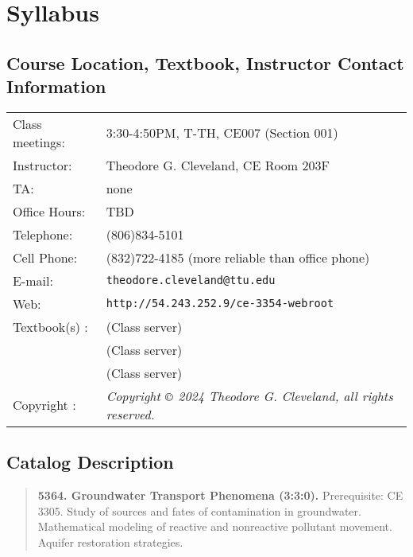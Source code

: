 \documentclass[12pt]{article}
\begin{document}
\section*{Syllabus}

\subsection*{{Course Location, Textbook, Instructor Contact Information}}
\begin{tabular}{p{1.5in}p{5.0in}}
Class meetings: &   3:30-4:50PM, T-TH, CE007 (Section 001) \\
Instructor: & Theodore G. Cleveland, CE Room 203F \\
TA: & none \\
Office Hours: & TBD \\%
Telephone: & (806)834-5101 \\
Cell Phone: & (832)722-4185 (more reliable than office phone) \\
E-mail: & \texttt{theodore.cleveland@ttu.edu}\\
Web: & \texttt{http://54.243.252.9/ce-3354-webroot}\\
Textbook(s) : & \cite{BRN1999} (Class server) \\
~ & \cite{Bear2010} (Class server) \\
~ & \cite{Cleveland2024} (Class server)\\
Copyright : & \textsl{Copyright $\copyright$ 2024 Theodore G. Cleveland, all rights reserved.} \\
\end{tabular}
\subsection*{{Catalog Description}}
\begin{quote} \textbf{5364. Groundwater Transport Phenomena (3:3:0).}  Prerequisite: CE 3305. Study of sources and fates of contamination in groundwater.
Mathematical modeling of reactive and nonreactive pollutant movement. Aquifer restoration strategies.
\end{quote}
\end{document}
